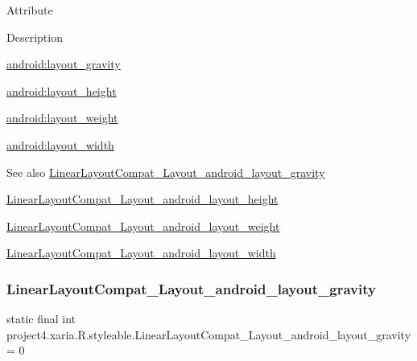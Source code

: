 Attribute

Description 

{\ttfamily \hyperlink{classproject4_1_1xaria_1_1R_1_1styleable_a3d4210a3c6954cfd1b37a9986adcce9a}{android\+:layout\+\_\+gravity}}

{\ttfamily \hyperlink{classproject4_1_1xaria_1_1R_1_1styleable_a514bc318a57eacc2db4dabf146f619d7}{android\+:layout\+\_\+height}}

{\ttfamily \hyperlink{classproject4_1_1xaria_1_1R_1_1styleable_af9b6891271285deca2960de74d2f02e6}{android\+:layout\+\_\+weight}}

{\ttfamily \hyperlink{classproject4_1_1xaria_1_1R_1_1styleable_a4640277fdb6931622906c6d4df4ca733}{android\+:layout\+\_\+width}}

\begin{DoxySeeAlso}{See also}
\hyperlink{classproject4_1_1xaria_1_1R_1_1styleable_a3d4210a3c6954cfd1b37a9986adcce9a}{Linear\+Layout\+Compat\+\_\+\+Layout\+\_\+android\+\_\+layout\+\_\+gravity} 

\hyperlink{classproject4_1_1xaria_1_1R_1_1styleable_a514bc318a57eacc2db4dabf146f619d7}{Linear\+Layout\+Compat\+\_\+\+Layout\+\_\+android\+\_\+layout\+\_\+height} 

\hyperlink{classproject4_1_1xaria_1_1R_1_1styleable_af9b6891271285deca2960de74d2f02e6}{Linear\+Layout\+Compat\+\_\+\+Layout\+\_\+android\+\_\+layout\+\_\+weight} 

\hyperlink{classproject4_1_1xaria_1_1R_1_1styleable_a4640277fdb6931622906c6d4df4ca733}{Linear\+Layout\+Compat\+\_\+\+Layout\+\_\+android\+\_\+layout\+\_\+width} 
\end{DoxySeeAlso}
\mbox{\label{classproject4_1_1xaria_1_1R_1_1styleable_a3d4210a3c6954cfd1b37a9986adcce9a}} 
\subsubsection{\texorpdfstring{Linear\+Layout\+Compat\+\_\+\+Layout\+\_\+android\+\_\+layout\+\_\+gravity}{LinearLayoutCompat\_Layout\_android\_layout\_gravity}}
{\footnotesize\ttfamily static final int project4.\+xaria.\+R.\+styleable.\+Linear\+Layout\+Compat\+\_\+\+Layout\+\_\+android\+\_\+layout\+\_\+gravity = 0\hspace{0.3cm}{\ttfamily [static]}}

